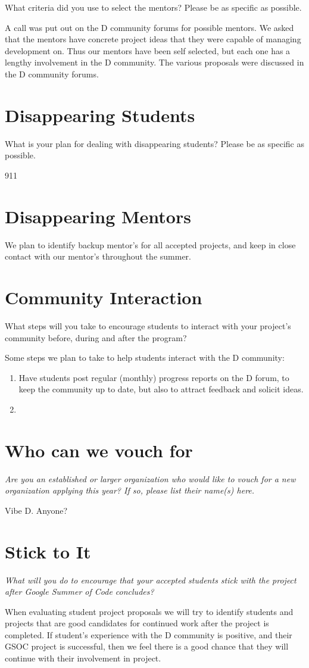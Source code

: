 \documentclass[a4paper,12pt]{article}
\begin{document}
What criteria did you use to select the mentors? 
Please be as specific as possible.

A call was put out on the D community forums for possible mentors.
We asked that the mentors have concrete project ideas that
they were capable of managing development on.  Thus our mentors
have been self selected, but each one has a lengthy involvement 
in the D community. The various proposals were discussed
in the D community forums. 

\section{Disappearing Students}
What is your plan for dealing with disappearing students? 
Please be as specific as possible.

911

\section{Disappearing Mentors}

We plan to identify backup mentor's for all accepted projects, 
and keep in close contact with our mentor's throughout the
summer.  

\section{Community Interaction}
What steps will you take to encourage students to interact 
with your project's community before, during and after 
the program?

Some steps we plan to take to help students interact with
the D community:

\begin{enumerate}
\item Have students post regular (monthly) progress reports
on the D forum, to keep the community up to date, but also
to attract feedback and solicit ideas.
\item 
\end{enumerate}

\section{Who can we vouch for}
\emph{Are you an established or larger organization who would like to 
vouch for a new organization applying this year? If so, please 
list their name(s) here.}

Vibe D.   Anyone?

\section{Stick to It}
\emph{What will you do to encourage that your accepted students stick 
with the project after Google Summer of Code concludes?}

When evaluating student project proposals we will try to identify
students and projects that are good candidates for continued work
after the project is completed.  If student's experience with the 
D community is positive, and their GSOC project is successful, then
we feel there is a good chance that they will continue with their
involvement in project. 
\end{document}
